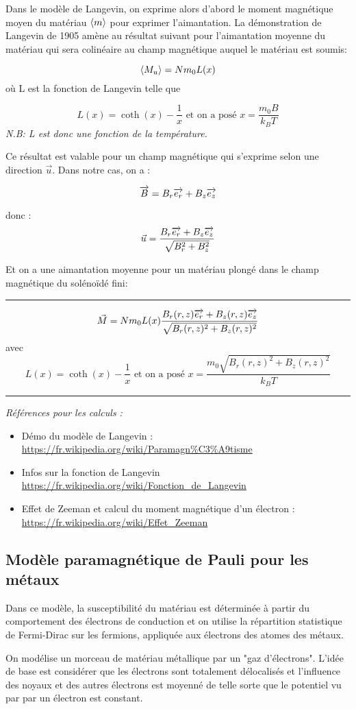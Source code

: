 \documentclass{report}
\begin{document}
Dans le modèle de Langevin, on exprime alors d'abord le moment magnétique moyen du matériau $\valmoy{m}$ pour exprimer l'aimantation. La démonstration de Langevin de 1905 amène au résultat suivant pour l'aimantation moyenne du matériau qui sera colinéaire au champ magnétique auquel le matériau est soumis:

$$\valmoy{M_u} = Nm_0L(x)$$
où L est la fonction de Langevin telle que

$$L(x) = \coth(x) - \frac{1}{x} \mbox{ et on a posé } x = \frac{m_0 B}{k_B T}$$
\emph{N.B: L est donc une fonction de la température.}

Ce résultat est valable pour un champ magnétique qui s'exprime selon une direction $\vec{u}$. Dans notre cas, on a :

$$\overrightarrow{B} = B_r \overrightarrow{e_r} + B_z \overrightarrow{e_z} $$

donc : 
$$\vec{u} = \frac{B_r \overrightarrow{e_r} + B_z \overrightarrow{e_z}}{\sqrt{B_r^2 + B_z^2}}$$

Et on a une aimantation moyenne pour un matériau plongé dans le champ magnétique du solénoïdé fini:
\rule{\textwidth}{0.4pt}
    $$\vec{M} = Nm_0L(x) \frac{B_r(r,z) \overrightarrow{e_r} + B_z(r,z) \overrightarrow{e_z}}{\sqrt{B_r(r,z)^2 + B_z(r,z)^2}} $$
avec $$L(x) = \coth(x) - \frac{1}{x} \mbox{ et on a posé } x = \frac{m_0 \sqrt{B_r(r,z)^2 + B_z(r,z)^2}}{k_B T}$$
\rule{\textwidth}{0.4pt}

\emph{Références pour les calculs : }
\begin{itemize}
    \item Démo du modèle de Langevin  : \url{https://fr.wikipedia.org/wiki/Paramagn%C3%A9tisme}
    \item Infos sur la fonction de Langevin \url{https://fr.wikipedia.org/wiki/Fonction_de_Langevin}
    \item Effet de Zeeman et calcul du moment magnétique d'un électron : \url{https://fr.wikipedia.org/wiki/Effet_Zeeman}
\end{itemize} 

\subsection{Modèle paramagnétique de Pauli pour les métaux}
Dans ce modèle, la susceptibilité du matériau est déterminée à partir du comportement des électrons de conduction et on utilise la répartition statistique de Fermi-Dirac sur les fermions, appliquée aux électrons des atomes des métaux. 

On modélise un morceau de matériau métallique par un "gaz d'électrons". L’idée de base est considérer que les électrons sont totalement délocalisés et l’influence des noyaux et des autres électrons est moyenné de telle sorte que le potentiel vu par par un électron est constant. 
\end{document}
